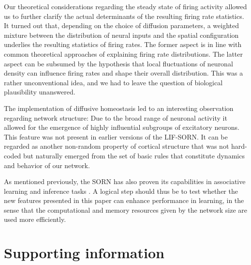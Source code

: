 \documentclass[10pt,letterpaper]{article}
\begin{document}
Our theoretical considerations regarding the steady state of firing activity allowed us to further clarify the actual determinants of the resulting firing rate statistics. It turned out that, depending on the choice of diffusion parameters, a weighted mixture between the distribution of neural inputs and the spatial configuration underlies the resulting statistics of firing rates. The former aspect is in line with common theoretical approaches of explaining firing rate distributions. The latter aspect can be subsumed by the hypothesis that local fluctuations of neuronal density can influence firing rates and shape their overall distribution. This was a rather unconventional idea, and we had to leave the question of biological plausibility unanswered.  

The implementation of diffusive homeostasis led to an interesting observation regarding network structure: Due to the broad range of neuronal activity it allowed for the emergence of highly influential subgroups of excitatory neurons. This feature was not present in earlier versions of the LIF-SORN. It can be regarded as another non-random property of cortical structure that was not hard-coded but naturally emerged from the set of basic rules that constitute dynamics and behavior of our network.

As mentioned previously, the SORN has also proven its capabilities in associative learning and inference tasks \cite{Hartmann_2016}. A logical step should thus be to test whether the new features presented in this paper can enhance performance in learning, in the sense that the computational and memory resources given by the network size are used more efficiently. 

\nolinenumbers

%
%
% 
\newpage


\newpage

\section*{Supporting information}
\end{document}
